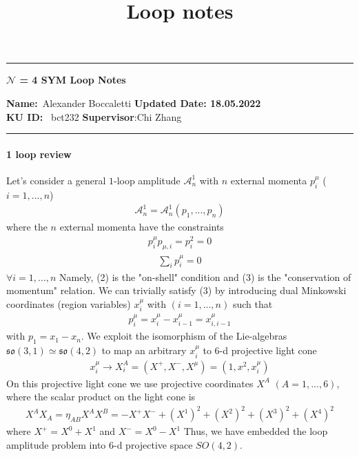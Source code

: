 \documentclass[12pt]{scrartcl}
\title{Loop notes}
\begin{document}
\begin{center}
	\hrule
	\vspace{.4cm}
	{\textbf { \large $\mathcal{N}$ = 4 SYM Loop Notes}}
\end{center}
{\textbf{Name:}\ Alexander Boccaletti \hspace{\fill} \textbf{Updated Date: 18.05.2022}    \\
{ \textbf{KU ID:}} \ bct232 \hspace{\fill} \textbf{Supervisor}:\space Chi Zhang \\
	\hrule

\paragraph*{1 loop review} 
Let's consider a general $1$-loop amplitude $\mathcal{A}_n^1$ with $n$ external momenta $p_i^{\mu}$ ($i=1,...,n$)
\begin{align}
    \mathcal{A}_n^1 = \mathcal{A}_n^1(p_1,...,p_n)
\end{align}
where the $n$ external momenta have the constraints
\begin{align}
    p_i^{\mu}p_{\mu ,i} = p_i^2 = 0
\end{align}
\begin{align}
    \sum_i p_i^{\mu} = 0
\end{align}
$\forall i=1,...,n$
Namely, (2) is the "on-shell" condition and (3) is the "conservation of momentum" relation.
We can trivially satisfy (3) by introducing dual Minkowski coordinates (region variables) $x_i^{\mu}$ with $(i=1,...,n)$ such that
\begin{align}
    p_i^{\mu} = x_i^{\mu} - x_{i-1}^{\mu} = x_{i,i-1}^{\mu}
\end{align}
with $p_1 = x_1 - x_n$. We exploit the isomorphism of the Lie-algebras $\mathfrak{so}(3,1) \simeq \mathfrak{so}(4,2)$ to map an arbitrary $x_i^{\mu}$ to 6-d projective light cone
\begin{align}
    x_i^{\mu} \to X_i^A =(X^{+},X^{-},X^{\mu}) = (1,x^2,x_i^{\mu})
\end{align}
On this projective light cone we use projective coordinates $X^A$ $(A=1,...,6)$, where the scalar product on the light cone is
\begin{align}
    X^AX_A = \eta_{AB}X^AX^B = -X^+X^- + (X^1)^2  + (X^2)^2 + (X^3)^2 + (X^4)^2
\end{align}
where $X^+ = X^0 + X^1$ and $X^- = X^0 - X^1$ 
Thus, we have embedded the loop amplitude problem into 6-d projective space $SO(4,2)$.
}
\end{document}
